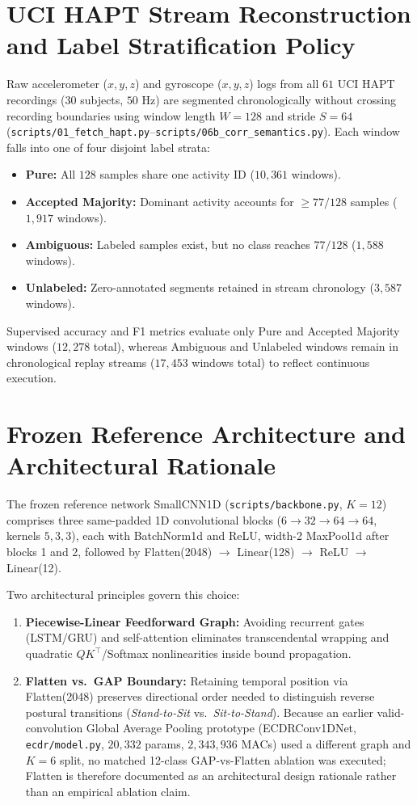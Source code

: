 \documentclass[11pt,oneside,a4paper]{report}
\newcommand{\code}[1]{{\small\upshape\ttfamily #1}}
\theoremstyle{remark}
\begin{document}
\section{UCI HAPT Stream Reconstruction and Label Stratification Policy}
Raw accelerometer ($x,y,z$) and gyroscope ($x,y,z$) logs from all $61$ UCI HAPT recordings ($30$ subjects, $50\text{ Hz}$) are segmented chronologically without crossing recording boundaries using window length $W=128$ and stride $S=64$ (\nolinkurl{scripts/01_fetch_hapt.py}--\nolinkurl{scripts/06b_corr_semantics.py}). Each window falls into one of four disjoint label strata:
\begin{itemize}[leftmargin=1.5em]
  \item \textbf{Pure:} All $128$ samples share one activity ID ($10,361$ windows).
  \item \textbf{Accepted Majority:} Dominant activity accounts for $\ge 77/128$ samples ($1,917$ windows).
  \item \textbf{Ambiguous:} Labeled samples exist, but no class reaches $77/128$ ($1,588$ windows).
  \item \textbf{Unlabeled:} Zero-annotated segments retained in stream chronology ($3,587$ windows).
\end{itemize}
Supervised accuracy and F1 metrics evaluate only Pure and Accepted Majority windows ($12,278$ total), whereas Ambiguous and Unlabeled windows remain in chronological replay streams ($17,453$ windows total) to reflect continuous execution.

\section{Frozen Reference Architecture and Architectural Rationale}
The frozen reference network \code{SmallCNN1D} (\nolinkurl{scripts/backbone.py}, $K=12$) comprises three same-padded 1D convolutional blocks ($6 \to 32 \to 64 \to 64$, kernels $5,3,3$), each with \code{BatchNorm1d} and \code{ReLU}, width-2 \code{MaxPool1d} after blocks 1 and 2, followed by \code{Flatten(2048)} $\to$ \code{Linear(128)} $\to$ \code{ReLU} $\to$ \code{Linear(12)}.

Two architectural principles govern this choice:
\begin{enumerate}[leftmargin=1.5em]
  \item \textbf{Piecewise-Linear Feedforward Graph:} Avoiding recurrent gates (LSTM/GRU) and self-attention eliminates transcendental wrapping and quadratic $QK^\top$/Softmax nonlinearities inside bound propagation.
  \item \textbf{Flatten vs.\ GAP Boundary:} Retaining temporal position via \code{Flatten(2048)} preserves directional order needed to distinguish reverse postural transitions (\textit{Stand-to-Sit} vs.\ \textit{Sit-to-Stand}). Because an earlier valid-convolution Global Average Pooling prototype (\code{ECDRConv1DNet}, \nolinkurl{ecdr/model.py}, $20,332$ params, $2,343,936$ MACs) used a different graph and $K=6$ split, no matched 12-class GAP-vs-Flatten ablation was executed; \code{Flatten} is therefore documented as an architectural design rationale rather than an empirical ablation claim.
\end{enumerate}
\end{document}
